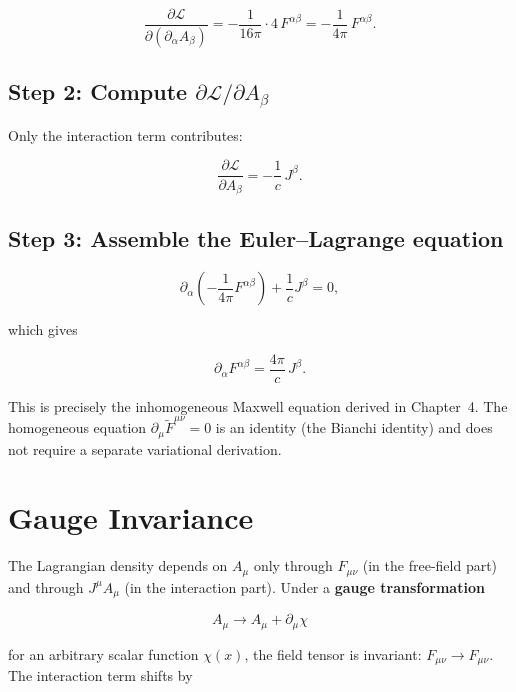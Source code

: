 \begin{equation}
\frac{\partial\mathcal{L}}{\partial(\partial_\alpha A_\beta)} = -\frac{1}{16\pi}\cdot 4\,F^{\alpha\beta} = -\frac{1}{4\pi}\,F^{\alpha\beta}.
\end{equation}

\subsection*{Step 2: Compute $\partial\mathcal{L}/\partial A_\beta$}

Only the interaction term contributes:

\begin{equation}
\frac{\partial\mathcal{L}}{\partial A_\beta} = -\frac{1}{c}\,J^\beta.
\end{equation}

\subsection*{Step 3: Assemble the Euler--Lagrange equation}

\begin{equation}
\partial_\alpha\!\left(-\frac{1}{4\pi}F^{\alpha\beta}\right) + \frac{1}{c}J^\beta = 0,
\end{equation}

which gives

\begin{equation}
\boxed{\partial_\alpha F^{\alpha\beta} = \frac{4\pi}{c}\,J^\beta.}
\end{equation}

This is precisely the inhomogeneous Maxwell equation derived in Chapter~4. The homogeneous equation $\partial_\mu\widetilde{F}^{\mu\nu} = 0$ is an identity (the Bianchi identity) and does not require a separate variational derivation.

\section{Gauge Invariance}

The Lagrangian density depends on $A_\mu$ only through $F_{\mu\nu}$ (in the free-field part) and through $J^\mu A_\mu$ (in the interaction part). Under a \textbf{gauge transformation}

\begin{equation}
A_\mu \to A_\mu + \partial_\mu\chi
\end{equation}

for an arbitrary scalar function $\chi(x)$, the field tensor is invariant: $F_{\mu\nu} \to F_{\mu\nu}$. The interaction term shifts by

